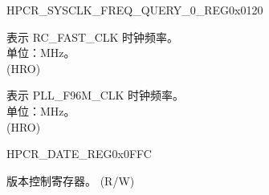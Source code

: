 \begin{register}{H}{PCR\_SYSCLK\_FREQ\_QUERY\_0\_REG}{0x0120}\label{regdesc:PCRSYSCLKFREQQUERY0REG}
%
%
%
\regnewline%
\begin{regdesc}\begin{reglist}
\label{fielddesc:PCRFOSCFREQ}\item [PCR\_FOSC\_FREQ] 表示 RC\_FAST\_CLK 时钟频率。\\
单位：MHz。\\ (HRO)
\label{fielddesc:PCRPLLFREQ}\item [PCR\_PLL\_FREQ] 表示 PLL\_F96M\_CLK 时钟频率。\\
单位：MHz。\\
(HRO)
\end{reglist}\end{regdesc}
\end{register}


\begin{register}{H}{PCR\_DATE\_REG}{0x0FFC}\label{regdesc:PCRDATEREG}
%
%
\regnewline%
\begin{regdesc}\begin{reglist}
\label{fielddesc:PCRDATE}\item [PCR\_DATE] 版本控制寄存器。 (R/W)
\end{reglist}\end{regdesc}
\end{register}


